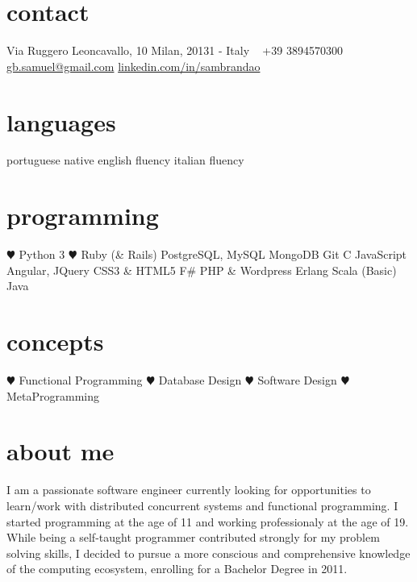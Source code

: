 \documentclass[]{friggeri-cv} %
\begin{document}


\begin{aside} %
\section{contact}
Via Ruggero 
Leoncavallo, 10
Milan, 20131 - Italy
~
+39 3894570300
~
\href{mailto:gb.samuel@gmail.com}{gb.samuel@gmail.com}
\href{it.linkedin.com/in/sambrandao}{linkedin.com/in/sambrandao}
\section{languages}
portuguese native
english fluency
italian fluency
\section{programming}
{\color{red} $\varheartsuit$} Python 3
{\color{red} $\varheartsuit$} Ruby (\& Rails)
PostgreSQL, MySQL
MongoDB
Git
C
JavaScript
Angular, JQuery
CSS3 \& HTML5
F\#
PHP \& Wordpress
Erlang
Scala (Basic)
Java
\section{concepts}
{\color{red} $\varheartsuit$} Functional Programming
{\color{red} $\varheartsuit$} Database Design
{\color{red} $\varheartsuit$} Software Design
{\color{red} $\varheartsuit$} MetaProgramming
\end{aside}


\section{about me}
I am a passionate software engineer currently looking for opportunities to 
learn/work with distributed concurrent systems and functional programming. I 
started programming at the age of 11 and working professionaly at the age of 19. 
While being a self-taught programmer contributed strongly for my problem solving
skills, I decided to pursue a more conscious and comprehensive knowledge of the 
computing ecosystem, enrolling for a Bachelor Degree in 2011. 
\end{document}

